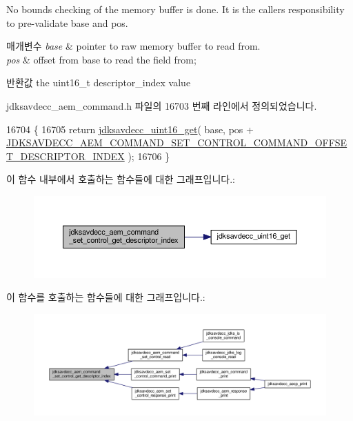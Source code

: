 No bounds checking of the memory buffer is done. It is the caller\textquotesingle{}s responsibility to pre-\/validate base and pos.


\begin{DoxyParams}{매개변수}
{\em base} & pointer to raw memory buffer to read from. \\
\hline
{\em pos} & offset from base to read the field from; \\
\hline
\end{DoxyParams}
\begin{DoxyReturn}{반환값}
the uint16\+\_\+t descriptor\+\_\+index value 
\end{DoxyReturn}


jdksavdecc\+\_\+aem\+\_\+command.\+h 파일의 16703 번째 라인에서 정의되었습니다.


\begin{DoxyCode}
16704 \{
16705     \textcolor{keywordflow}{return} \hyperlink{group__endian_ga3fbbbc20be954aa61e039872965b0dc9}{jdksavdecc\_uint16\_get}( base, pos + 
      \hyperlink{group__command__set__control_gaf64b3d6887fa5db21a50422df302ec12}{JDKSAVDECC\_AEM\_COMMAND\_SET\_CONTROL\_COMMAND\_OFFSET\_DESCRIPTOR\_INDEX}
       );
16706 \}
\end{DoxyCode}


이 함수 내부에서 호출하는 함수들에 대한 그래프입니다.\+:
\nopagebreak
\begin{figure}[H]
\begin{center}
\leavevmode
\includegraphics[width=350pt]{group__command__set__control_gafc0eea5691e5fc876385e663f57e2b40_cgraph}
\end{center}
\end{figure}




이 함수를 호출하는 함수들에 대한 그래프입니다.\+:
\nopagebreak
\begin{figure}[H]
\begin{center}
\leavevmode
\includegraphics[width=350pt]{group__command__set__control_gafc0eea5691e5fc876385e663f57e2b40_icgraph}
\end{center}
\end{figure}


